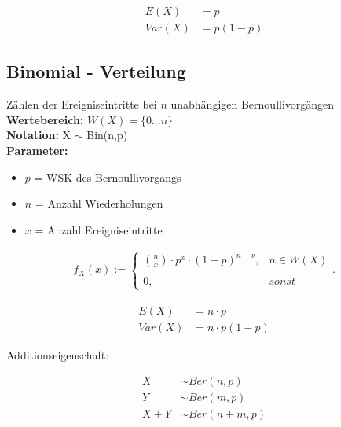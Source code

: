 \documentclass[10pt,a4paper]{article}
\begin{document}
  \begin{mdframed}[style=exercise]
    \begin{align}
        E(X) &= p \\
        Var(X) &= p(1-p) 
    \end{align}
  \end{mdframed}

\subsection{Binomial - Verteilung}
Zählen der Ereigniseintritte bei $n$ unabhängigen Bernoullivorgängen \\
\textbf{Wertebereich:} $W(X)= \{0 ... n \}$\\
\textbf{Notation:} X $\sim$ Bin(n,p) \\
\textbf{Parameter:} \begin{itemize}
    \item $p$ = WSK des Bernoullivorgangs 
    \item $n$ = Anzahl Wiederholungen 
    \item $x$ = Anzahl Ereigniseintritte 
\end{itemize}
  \begin{mdframed}[style=exercise]
    \begin{align}
        f_X(x):=\left\{\begin{array}{ll} \binom{n}{x} \cdot p^x \cdot (1-p)^{n-x}, & n \in W(X) \\ \\
        0, & sonst \end{array}\right. .
    \end{align}
  \end{mdframed}

  \begin{mdframed}[style=exercise]
    \begin{align}
        E(X) &= n\cdot p \\
        Var(X) &= n\cdot p (1-p) 
    \end{align}
  \end{mdframed}
  Additionseigenschaft:
  \begin{mdframed}[style=exercise]
    \begin{align}
        X   &\sim Ber(n,p)\\
        Y   &\sim Ber(m,p)\\
        X+Y &\sim Ber(n+m,p)
    \end{align}
  \end{mdframed}
\end{document}
